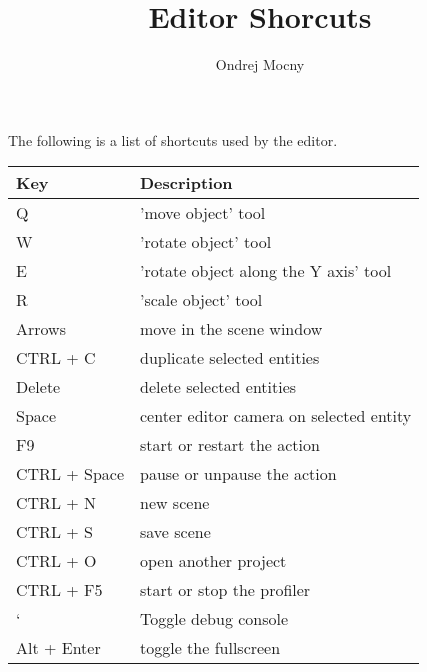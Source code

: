 \documentclass[a4paper, 12pt]{report}
\begin{document}
\pagestyle{empty} %

\title{Editor Shorcuts}
\author{Ondrej Mocny}

\pagestyle{plain} %

The following is a list of shortcuts used by the editor.

\begin{tabular}{|p{0.20\hsize}|p{0.7\hsize}|}
  \hline
  Key & Description \\
	\hline
	Q & 'move object' tool \\
	W & 'rotate object' tool \\
	E & 'rotate object along the Y axis' tool \\
	R & 'scale object' tool \\
	\hline
	Arrows & move in the scene window \\
	CTRL + C & duplicate selected entities \\
	Delete & delete selected entities \\
	Space & center editor camera on selected entity \\
	F9 & start or restart the action \\
	CTRL + Space & pause or unpause the action \\
	\hline
	CTRL + N & new scene \\
	CTRL + S & save scene \\
	CTRL + O & open another project \\
	\hline
	CTRL + F5 & start or stop the profiler \\
	` & Toggle debug console \\
	Alt + Enter & toggle the fullscreen \\
	\hline
\end{tabular}
\end{document}
